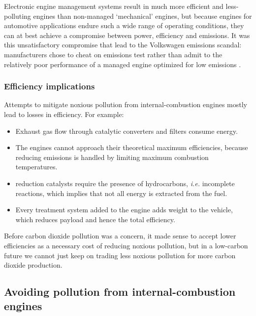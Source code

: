 Electronic engine management systems result in much more efficient and
less-polluting engines than non-managed `mechanical' engines, but because
engines for automotive applications endure such a wide range of operating
conditions, they can at best achieve a compromise between power, efficiency and
emissions. It was this unsatisfactory compromise that lead to the Volkswagen
emissions scandal: manufacturers chose to cheat on emissions test rather than
admit to the relatively poor performance of a managed engine optimized for low
emissions \autocite{Mansouri2016}.

\subsubsection{Efficiency implications}

Attempts to mitigate noxious pollution from internal\hyp{}combustion engines
mostly lead to losses in efficiency. For example:

\begin{itemize}

\item Exhaust gas flow through catalytic converters and filters consume energy.
  
\item The engines cannot approach their theoretical maximum efficiencies,
because reducing \nox emissions is handled by limiting maximum combustion
temperatures.

\item \nox reduction catalysts require the presence of hydrocarbons,
\textit{i.e.} incomplete reactions, which implies that not all energy is
extracted from the fuel.

\item Every treatment system added to the engine adds weight to the vehicle, which
reduces payload and hence the total efficiency.

\end{itemize}

Before carbon dioxide pollution was a concern, it made sense to accept lower
efficiencies as a necessary cost of reducing noxious pollution, but in a
low-carbon future we cannot just keep on trading less noxious pollution for more
carbon dioxide production.

\subsection{Avoiding pollution from internal\hyp{}combustion engines} \label{par:carbon-neutral}

